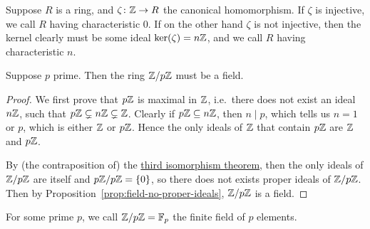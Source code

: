 \begin{definition}
    Suppose \(R\) is a ring,
    and \(\zeta\colon\mathbb{Z}\to R\) the canonical homomorphism.
    If \(\zeta\) is injective, %
    we call \(R\) having characteristic 0.
    If on the other hand \(\zeta\) is not injective,
    then the kernel clearly must be some ideal \(\ker(\zeta) = n\mathbb{Z}\),
    and we call \(R\) having characteristic \(n\).
\end{definition}
\begin{proposition}
    Suppose \(p\) prime.
    Then the ring \(\mathbb{Z}/p\mathbb{Z}\) must be a field.
\end{proposition}
\begin{proof}
    We first prove that \(p\mathbb{Z}\) is maximal in \(\mathbb{Z}\),
    i.e.\ there does not exist an ideal \(n\mathbb{Z}\),
    such that \(p\mathbb{Z} \subsetneq n\mathbb{Z} \subsetneq \mathbb{Z}\).
    Clearly if \(p\mathbb{Z} \subseteq n\mathbb{Z}\),
    then \(n \mid p\), which tells us \(n = 1\) or \(p\),
    which is either \(\mathbb{Z}\) or \(p\mathbb{Z}\).
    Hence the only ideals of \(\mathbb{Z}\) that contain \(p\mathbb{Z}\)
    are \(\mathbb{Z}\) and \(p\mathbb{Z}\).

    By (the contraposition of)
    the \hyperref[thm:iso-3-ring]{third isomorphism theorem},
    then the only ideals of \(\mathbb{Z}/p\mathbb{Z}\) are itself and \(p\mathbb{Z}/p\mathbb{Z} = \{0\}\),
    so there does not exists proper ideals of \(\mathbb{Z}/p\mathbb{Z}\).
    Then by Proposition~\ref{prop:field-no-proper-ideals},
    \(\mathbb{Z}/p\mathbb{Z}\) is a field.
\end{proof}
\begin{definition}
    For some prime \(p\),
    we call \(\mathbb{Z}/p\mathbb{Z} = \mathbb{F}_p\)
    the finite field of \(p\) elements.
\end{definition}

